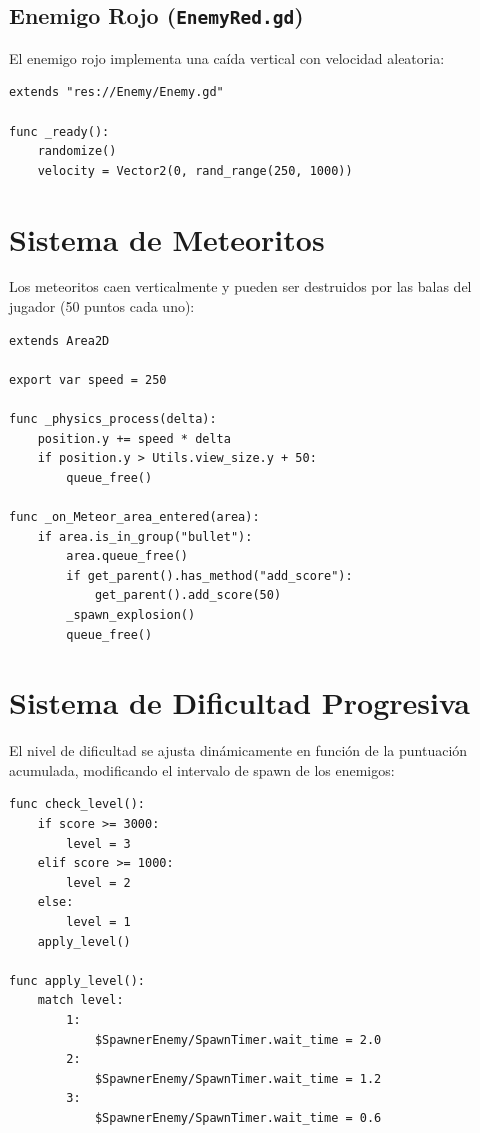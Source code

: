 \documentclass[12pt, a4paper, oneside]{report}
\begin{document}
\subsection{Enemigo Rojo (\texttt{EnemyRed.gd})}
El enemigo rojo implementa una caída vertical con velocidad aleatoria:

\begin{lstlisting}[style=gdscript, caption=Movimiento del enemigo rojo]
extends "res://Enemy/Enemy.gd"

func _ready():
    randomize()
    velocity = Vector2(0, rand_range(250, 1000))
\end{lstlisting}

\section{Sistema de Meteoritos}

Los meteoritos caen verticalmente y pueden ser destruidos por las balas del jugador (50 puntos cada uno):

\begin{lstlisting}[style=gdscript, caption=Sistema de meteoritos]
extends Area2D

export var speed = 250

func _physics_process(delta):
    position.y += speed * delta
    if position.y > Utils.view_size.y + 50:
        queue_free()

func _on_Meteor_area_entered(area):
    if area.is_in_group("bullet"):
        area.queue_free()
        if get_parent().has_method("add_score"):
            get_parent().add_score(50)
        _spawn_explosion()
        queue_free()
\end{lstlisting}

\section{Sistema de Dificultad Progresiva}

El nivel de dificultad se ajusta dinámicamente en función de la puntuación acumulada, modificando el intervalo de spawn de los enemigos:

\begin{lstlisting}[style=gdscript, caption=Sistema de niveles y dificultad progresiva]
func check_level():
    if score >= 3000:
        level = 3
    elif score >= 1000:
        level = 2
    else:
        level = 1
    apply_level()

func apply_level():
    match level:
        1:
            $SpawnerEnemy/SpawnTimer.wait_time = 2.0
        2:
            $SpawnerEnemy/SpawnTimer.wait_time = 1.2
        3:
            $SpawnerEnemy/SpawnTimer.wait_time = 0.6
\end{lstlisting}
\end{document}
